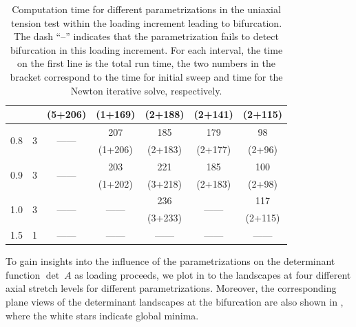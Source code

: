 \documentclass[12pt]{article}
\numberwithin{equation}{section}
\begin{document}
\begin{table}[!htbp]
\begin{center}
\begin{tabular}{c c | c c c c c}
      {}  &  {}  &	 (5+206)  &  (1+169)  &  (2+188)   &  (2+141)  &  (2+115)   \\
      \midrule      
      \multirow{2}{*}{0.8}   &  \multirow{2}{*}{3}  &  \multirow{2}{*}{------}  &  207  &  185  &  179  &  98  \\
      {}  &  {}  &  {}  &  (1+206)  &  (2+183)   &  (2+177)  &  (2+96)   \\
      \midrule      
      \multirow{2}{*}{0.9}   &  \multirow{2}{*}{3}  &  \multirow{2}{*}{------}  &  203  &  221  &  185  &  100  \\
      {}  &  {}  &  {}  &  (1+202)  &  (3+218)   &  (2+183)  &  (2+98)   \\
      \midrule      
      \multirow{2}{*}{1.0}   &  \multirow{2}{*}{3}  &  \multirow{2}{*}{------}  
        &  \multirow{2}{*}{------}  &  236  &  \multirow{2}{*}{------}  &  117  \\
      {}  &  {}  &  {}  &  {}  &  (3+233)   &  {}  &  (2+115)   \\
      \midrule      
      \multirow{2}{*}{1.5}   &  \multirow{2}{*}{1}
        &  \multirow{2}{*}{------}  &  \multirow{2}{*}{------}  
        &  \multirow{2}{*}{------}  &  \multirow{2}{*}{------}  &  \multirow{2}{*}{------}  \\
      {}  &  {}  &  {}  &  {}  &  {}  &  {}  &  {}  \\
      \bottomrule
    \end{tabular}
    \caption{Computation time for different parametrizations in the
      uniaxial tension test within the loading increment leading to
      bifurcation.  The dash ``--'' indicates that the parametrization
      fails to detect bifurcation in this loading increment. For each interval, 
      the time on the first line is the total run time, the two numbers in the 
      bracket correspond to the time for initial sweep and time for the Newton 
      iterative solve, respectively.}
    \label{tab:aniso-uniaxial-runtime}
  \end{center}
\end{table}

To gain insights into the influence of the parametrizations on the
determinant function $\det~A$ as loading proceeds, we plot in
 to  the
landscapes at four different axial stretch levels for different
parametrizations. Moreover, the corresponding plane views of the 
determinant landscapes at the bifurcation are also shown in
, where the white stars indicate global
minima.
\end{document}
